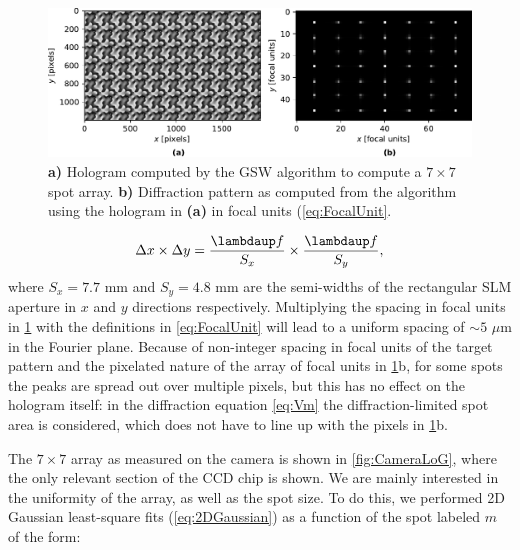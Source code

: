 \begin{figure}
    \centering
    \includegraphics[width=\textwidth]{figures/MaskAndComputedPattern.pdf}
    \caption{\textsf{\textbf{a)}} Hologram computed by the \ac{GSW} algorithm to compute a $7\times7$ spot array.
    \textsf{\textbf{b)}} Diffraction pattern as computed from the algorithm using the hologram in \textsf{\textbf{(a)}} in focal units (\cref{eq:FocalUnit}.}
    \label{fig:HologramPattern}
\end{figure}

\begin{equation}\label{eq:FocalUnit}
    \Delta x \times \Delta y = \frac{\lambdaup f}{S_x}\times \frac{\lambdaup f}{S_y},
\end{equation}
where $S_x = 7.7$ mm and $S_y = 4.8$ mm are the semi-widths of the rectangular SLM aperture in $x$ and $y$ directions respectively.
Multiplying the spacing in focal units in \cref{fig:HologramPattern} with the definitions in \cref{eq:FocalUnit} will lead to a uniform spacing of $\sim 5$ $\mu$m in the Fourier plane. 
Because of non-integer spacing in focal units of the target pattern and the pixelated nature of the array of focal units in \ref{fig:HologramPattern}b, for some spots the peaks are spread out over multiple pixels, but this has no effect on the hologram itself: in the diffraction equation \cref{eq:Vm} the diffraction-limited spot area is considered, which does not have to line up with the pixels in \cref{fig:HologramPattern}b.

The $7\times7$ array as measured on the camera is shown in \cref{fig:CameraLoG}, where the only relevant section of the CCD chip is shown. 
We are mainly interested in the uniformity of the array, as well as the spot size.
To do this, we performed 2D Gaussian least-square fits (\cref{eq:2DGaussian}) as a function of the spot labeled $m$ of the form:

